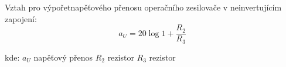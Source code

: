 			
			
			Vztah pro výpořetnapěťového přenosu operačního zesilovače v neinvertujícím zapojení:
			\begin{equation}
  				a_U = 20\log 1+\dfrac{R_2}{R_3}
  			\end{equation}		
		
			\hspace*{2cm}kde:\newline    
  			\hspace*{4cm}$a_U$ \dotfill napěťový přenos\hspace*{4cm}\newline
	  		\hspace*{4cm}$R_2$ \dotfill rezistor\hspace*{4cm}\newline
	  		\hspace*{4cm}$R_3$ \dotfill rezistor\hspace*{4cm}\newline
  
  


